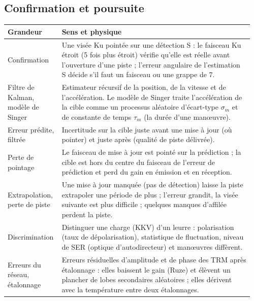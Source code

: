 \documentclass[11pt,a4paper]{article}
\begin{document}
\subsection{Confirmation et poursuite}
{\small
\begin{longtable}{@{}p{0.2\linewidth}p{0.76\linewidth}@{}}
\toprule
Grandeur & Sens et physique\\
\midrule
\endhead
Confirmation & Une visée Ku pointée sur une détection S : le faisceau Ku étroit (5 fois plus étroit) vérifie qu'elle est
réelle avant l'ouverture d'une piste ; l'erreur angulaire de l'estimation S décide s'il faut un faisceau ou une grappe
de 7.\\
Filtre de Kalman, modèle de Singer & Estimateur récursif de la position, de la vitesse et de l'accélération. Le modèle
de Singer traite l'accélération de la cible comme un processus aléatoire d'écart-type $\sigma_m$ et de constante de
temps $\tau_m$ (la durée d'une man\oe{}uvre).\\
Erreur prédite, filtrée & Incertitude sur la cible juste avant une mise à jour (où pointer) et juste après (qualité de
piste délivrée).\\
Perte de pointage & Le faisceau de mise à jour est pointé sur la prédiction ; la cible est hors du centre du faisceau de
l'erreur de prédiction et perd du gain en émission et en réception.\\
Extrapolation, perte de piste & Une mise à jour manquée (pas de détection) laisse la piste extrapoler une période de
plus ; l'erreur grandit, la visée suivante est plus difficile ; quelques manques d'affilée perdent la piste.\\
Discrimination & Distinguer une charge (KKV) d'un leurre : polarisation (taux de dépolarisation), statistique de
fluctuation, niveau de SER (optique d'autodirecteur) et man\oe{}uvres diffèrent.\\
Erreurs du réseau, étalonnage & Erreurs résiduelles d'amplitude et de phase des TRM après étalonnage : elles baissent le
gain (Ruze) et élèvent un plancher de lobes secondaires aléatoires ; elles dérivent avec la température entre deux
étalonnages.\\
\bottomrule
\end{longtable}}

\end{document}
